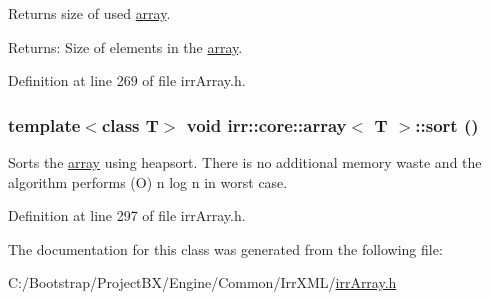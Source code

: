 Returns size of used \hyperlink{classirr_1_1core_1_1array}{array}. \begin{Desc}
\item[Returns:]Size of elements in the \hyperlink{classirr_1_1core_1_1array}{array}. \end{Desc}


Definition at line 269 of file irrArray.h.\hypertarget{classirr_1_1core_1_1array_d25908968e87d8c6a43f36a7143bc10b}{
\subsubsection[{sort}]{\setlength{\rightskip}{0pt plus 5cm}template$<$class T$>$ void {\bf irr::core::array}$<$ T $>$::sort ()}}
\label{classirr_1_1core_1_1array_d25908968e87d8c6a43f36a7143bc10b}


Sorts the \hyperlink{classirr_1_1core_1_1array}{array} using heapsort. There is no additional memory waste and the algorithm performs (O) n log n in worst case. 

Definition at line 297 of file irrArray.h.

The documentation for this class was generated from the following file:\begin{CompactItemize}
\item 
C:/Bootstrap/ProjectBX/Engine/Common/IrrXML/\hyperlink{irr_array_8h}{irrArray.h}\end{CompactItemize}
